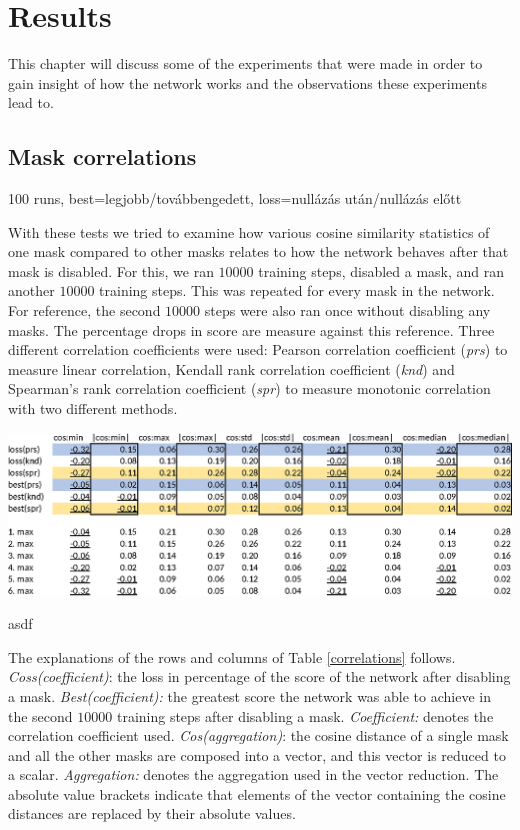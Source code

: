 \documentclass[12pt]{report}
\begin{document}
\chapter{Results}
This chapter will discuss some of the experiments that were made in order to gain insight of how the network works and the observations these experiments lead to.
\section{Mask correlations}
100 runs, best=legjobb/továbbengedett, loss=nullázás után/nullázás előtt

With these tests we tried to examine how various cosine similarity statistics of one mask compared to other masks relates to how the network behaves after that mask is disabled. For this, we ran $10000$ training steps, disabled a mask, and ran another $10000$ training steps. This was repeated for every mask in the network. For reference, the second $10000$ steps were also ran once without disabling any masks. The percentage drops in score are measure against this reference. Three different correlation coefficients were used: Pearson correlation coefficient (\textit{prs}) \cite{prs} to measure linear correlation, Kendall rank correlation coefficient (\textit{knd}) \cite{knd} and Spearman's rank correlation coefficient (\textit{spr}) \cite{spr} to measure monotonic correlation with two different methods.
\begin{table}[h!]
	\centering
	\includegraphics[scale=0.85]{dia/table.eps}
	\caption{asdf}\label{correlations}
\end{table}

The explanations of the rows and columns of Table \ref{correlations} follows. \textit{Coss(coefficient)}: the loss in percentage of the score of the network after disabling a mask. \textit{Best(coefficient):} the greatest score the network was able to achieve in the second $10000$ training steps after disabling a mask. \textit{Coefficient:} denotes the correlation coefficient used. \textit{Cos(aggregation)}: the cosine distance of a single mask and all the other masks are composed into a vector, and this vector is reduced to a scalar. \textit{Aggregation:} denotes the aggregation used in the vector reduction. The absolute value brackets indicate that elements of the vector containing the cosine distances are replaced by their absolute values.
\end{document}
